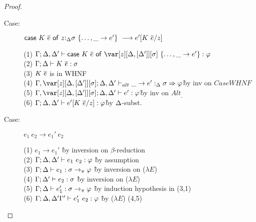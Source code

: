 \begin{proof}
\begin{description}
\begin{tabbing}
\end{tabbing}

\item[Case:]
    $\mathsf{case}~K~\overline{e}~\mathsf{of}~z{:}_{\Delta}\sigma~\{\dots,\_\to e'\}\ \longrightarrow e'[K~\overline{e}/z]$
\begin{tabbing}
    (1) $\G;\D,\D' \vdash \ccase{K~\ov{e}}{\zD~\{\dots,\_ \to e'\}} : \vp$\\
    (2) $\Gamma;\Delta \vdash K~\overline{e} : \sigma$\\
    (3) $K~\overline{e}$ is in WHNF\\
    (4) $\G,\zD;\D,\D' \vdash_{alt} \_ \to e' :_{\D} \s \Rightarrow \vp$\`by inv on $CaseWHNF$\\
    (5) $\G,\zD;\D,\D' \vdash e' : \vp$\`by inv on $Alt_\_$\\
    (6) $\Gamma;\Delta,\Delta' \vdash e'[K~\overline{e}/z] : \varphi$\` by $\Delta$-subst.\\
\end{tabbing}

\item[Case:] $e_1~e_2 \longrightarrow e_1'~e_2$
\begin{tabbing}
(1) $e_1 \longrightarrow e_1'$ \` by inversion on $\beta$-reduction \\
(2) $\Gamma;\Delta,\Delta' \vdash e_1~e_2 : \varphi$ \` by assumption \\
(3) $\Gamma; \Delta \vdash e_1 : \sigma \to_\pi \varphi$ \` by inversion on ($\lambda E$) \\
(4) $\Gamma; \Delta' \vdash e_2 : \sigma$ \` by inversion on ($\lambda E$) \\
(5) $\Gamma; \Delta \vdash e_1' : \sigma \to_\pi \varphi$ \` by induction hypothesis in (3,1) \\
(6) $\Gamma; \Delta, \Delta' \Gamma' \vdash e_1'~e_2 : \varphi$ \` by ($\lambda E$) (4,5) \\
\end{tabbing}


\end{description}
\end{proof}
